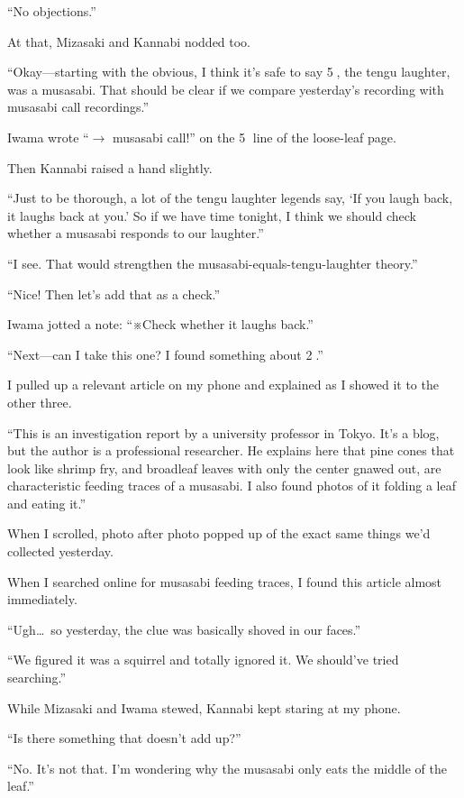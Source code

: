 \documentclass[
    a4paper,
    12pt,
    twoside,
    openany,
    UTF8,
    fontset=windows
]{ctexbook}
\begin{document}
``No objections.''

At that, Mizasaki and Kannabi nodded too.

``Okay---starting with the obvious, I think it's safe to say \textcircled{5}, the tengu laughter, was a musasabi. That should be clear if we compare yesterday's recording with musasabi call recordings.''

Iwama wrote ``$\rightarrow$ musasabi call!'' on the \textcircled{5} line of the loose-leaf page.

Then Kannabi raised a hand slightly.

``Just to be thorough, a lot of the tengu laughter legends say, `If you laugh back, it laughs back at you.' So if we have time tonight, I think we should check whether a musasabi responds to our laughter.''

``I see. That would strengthen the musasabi-equals-tengu-laughter theory.''

``Nice! Then let's add that as a check.''

Iwama jotted a note: ``※Check whether it laughs back.''

``Next---can I take this one? I found something about \textcircled{2}.''

I pulled up a relevant article on my phone and explained as I showed it to the other three.

``This is an investigation report by a university professor in Tokyo. It's a blog, but the author is a professional researcher. He explains here that pine cones that look like shrimp fry, and broadleaf leaves with only the center gnawed out, are characteristic feeding traces of a musasabi. I also found photos of it folding a leaf and eating it.''

When I scrolled, photo after photo popped up of the exact same things we'd collected yesterday.

When I searched online for musasabi feeding traces, I found this article almost immediately.

``Ugh\dots\ so yesterday, the clue was basically shoved in our faces.''

``We figured it was a squirrel and totally ignored it. We should've tried searching.''

While Mizasaki and Iwama stewed, Kannabi kept staring at my phone.

``Is there something that doesn't add up?''

``No. It's not that. I'm wondering why the musasabi only eats the middle of the leaf.''
\end{document}
